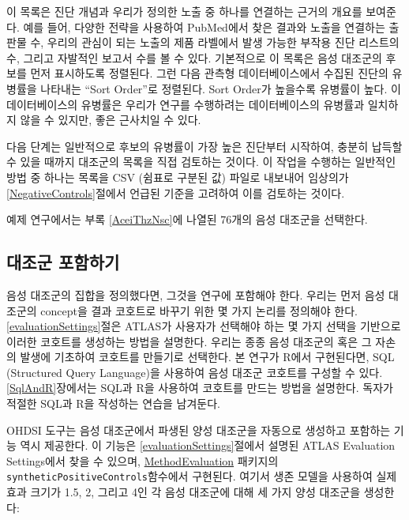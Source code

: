 \documentclass[10.5pt]{book}
\theoremstyle{definition}
\theoremstyle{definition}
\theoremstyle{definition}
\theoremstyle{remark}
\begin{document}
이 목록은 진단 개념과 우리가 정의한 노출 중 하나를 연결하는 근거의
개요를 보여준다. 예를 들어, 다양한 전략을 사용하여 PubMed에서 찾은
결과와 노출을 연결하는 출판물 수, 우리의 관심이 되는 노출의 제품
라벨에서 발생 가능한 부작용 진단 리스트의 수, 그리고 자발적인 보고서
수를 볼 수 있다. 기본적으로 이 목록은 음성 대조군의 후보를 먼저
표시하도록 정렬된다. 그런 다음 관측형 데이터베이스에서 수집된 진단의
유병률을 나타내는 ``Sort Order''로 정렬된다. Sort Order가 높을수록
유병률이 높다. 이 데이터베이스의 유병률은 우리가 연구를 수행하려는
데이터베이스의 유병률과 일치하지 않을 수 있지만, 좋은 근사치일 수 있다.

다음 단계는 일반적으로 후보의 유병률이 가장 높은 진단부터 시작하여,
충분히 납득할 수 있을 때까지 대조군의 목록을 직접 검토하는 것이다. 이
작업을 수행하는 일반적인 방법 중 하나는 목록을 CSV (쉼표로 구분된 값)
파일로 내보내어 임상의가 \ref{NegativeControls}절에서 언급된 기준을
고려하여 이를 검토하는 것이다.

예제 연구에서는 부록 \ref{AceiThzNsc}에 나열된 76개의 음성 대조군을
선택한다.

\subsection{대조군 포함하기}\label{-}

음성 대조군의 집합을 정의했다면, 그것을 연구에 포함해야 한다. 우리는
먼저 음성 대조군의 concept을 결과 코호트로 바꾸기 위한 몇 가지 논리를
정의해야 한다. \ref{evaluationSettings}절은 ATLAS가 사용자가 선택해야
하는 몇 가지 선택을 기반으로 이러한 코호트를 생성하는 방법을 설명한다.
우리는 종종 음성 대조군의 혹은 그 자손의 발생에 기초하여 코호트를
만들기로 선택한다. 본 연구가 R에서 구현된다면, SQL (Structured Query
Language)을 사용하여 음성 대조군 코호트를 구성할 수 있다.
\ref{SqlAndR}장에서는 SQL과 R을 사용하여 코호트를 만드는 방법을
설명한다. 독자가 적절한 SQL과 R을 작성하는 연습을 남겨둔다.

OHDSI 도구는 음성 대조군에서 파생된 양성 대조군을 자동으로 생성하고
포함하는 기능 역시 제공한다. 이 기능은 \ref{evaluationSettings}절에서
설명된 ATLAS Evaluation Settings에서 찾을 수 있으며,
\href{https://ohdsi.github.io/MethodEvaluation/}{MethodEvaluation}
패키지의 \texttt{syntheticPositiveControls}함수에서 구현된다. 여기서
생존 모델을 사용하여 실제 효과 크기가 1.5, 2, 그리고 4인 각 음성
대조군에 대해 세 가지 양성 대조군을 생성한다:
\end{document}
